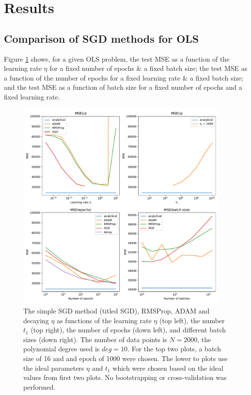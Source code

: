 \documentclass[11pt,a4paper,titlepage]{article}
\begin{document}
\section{Results}
\subsection{Comparison of SGD methods for OLS}
Figure \ref{fig:DifferentSGD} shows, for a given OLS problem, the test MSE as a function of the learning rate $\eta$ for a fixed number of epochs \& a fixed batch size; the test MSE as a function of the number of epochs for a fixed learning rate \& a fixed batch size; and the test MSE as a function of batch size for a fixed number of epochs and a fixed learning rate. 

\begin{figure}[H]
\centering
\includegraphics[width=0.95\textwidth]{OLS_error_SGD_idealLearningRate.pdf}
\caption[Test MSE Different SGD methods for OLS]{The simple SGD method (titled SGD), RMSProp, ADAM and decaying $\eta$ as functions of the learning rate $\eta$ (top left), the number $t_1$ (top right), the number of epochs (down left), and different batch sizes (down right). The number of data points is $N=2000$, the polynomial degree used is $deg=10$. For the top two plots, a batch size of 16 and and epoch of 1000 were chosen. The lower to plots use the ideal parameters $\eta$ and $t_1$ which were chosen based on the ideal values from first two plots. No bootstrapping or cross-validation was performed.}\label{fig:DifferentSGD}
\end{figure}
\end{document}
